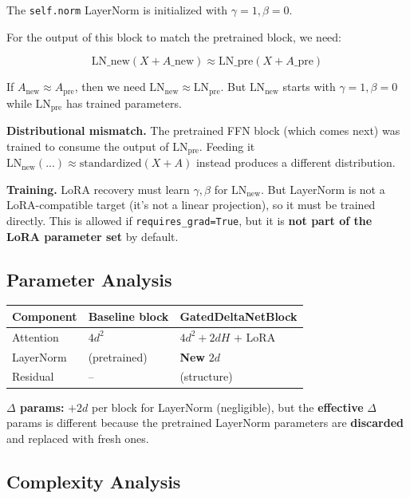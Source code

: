 The \texttt{self.norm} LayerNorm is initialized with $\gamma = 1, \beta = 0$.

For the output of this block to match the pretrained block, we need:

\[
\text{LN}\_\text{new}(X + A\_\text{new}) \approx \text{LN}\_\text{pre}(X + A\_\text{pre})
\tag{4.1}
\]

If $A_\text{new} \approx A_\text{pre}$, then we need 
$\text{LN}_\text{new} \approx \text{LN}_\text{pre}$. But 
$\text{LN}_\text{new}$ starts with $\gamma = 1, \beta = 0$ while 
$\text{LN}_\text{pre}$ has trained parameters.

\textbf{Distributional mismatch.} The pretrained FFN block (which comes next) was 
trained to consume the output of $\text{LN}_\text{pre}$. Feeding it 
$\text{LN}_\text{new}(...) \approx \text{standardized}(X + A)$ instead 
produces a different distribution.

\textbf{Training.} LoRA recovery must learn $\gamma, \beta$ for $\text{LN}_\text{new}$. 
But LayerNorm is not a LoRA-compatible target (it's not a linear projection), 
so it must be trained directly. This is allowed if \texttt{requires\_grad=True}, but 
it is \textbf{not part of the LoRA parameter set} by default.

\subsection{Parameter Analysis}

\begin{table}[H]
\centering
\small
\begin{tabular}{lll}
\toprule
\textbf{Component} & \textbf{Baseline block} & \textbf{GatedDeltaNetBlock} \\
\midrule
Attention & $4 d^2$ & $4 d^2 + 2 d H$ + LoRA \\
LayerNorm & (pretrained) & \textbf{New} $2d$ \\
Residual & -- & (structure) \\
\bottomrule
\end{tabular}
\end{table}

\textbf{$\Delta$ params:} $+2d$ per block for LayerNorm (negligible), but the \textbf{effective} 
$\Delta$ params is different because the pretrained LayerNorm parameters are 
\textbf{discarded} and replaced with fresh ones.

\subsection{Complexity Analysis}

